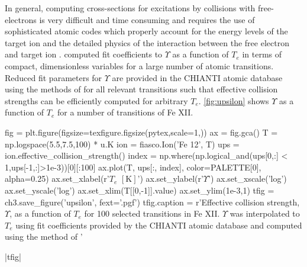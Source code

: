 In general, computing cross-sections for excitations by collisions with free-electrons is very difficult and time consuming and requires the use of sophisticated atomic codes which properly account for the energy levels of the target ion and the detailed physics of the interaction between the free electron and target ion \citep[][section 4.2.3]{phillips_ultraviolet_2008,bautista_theoretical_2000}. \citet{burgess_analysis_1992} computed fit coefficients to $\Upsilon$ as a function of $T_e$ in terms of compact, dimensionless variables for a large number of atomic transitions. Reduced fit parameters for $\Upsilon$ are provided in the CHIANTI atomic database using the methods of \citet{burgess_analysis_1992} for all relevant transitions such that effective collision strengths can be efficiently computed for arbitrary $T_e$. \autoref{fig:upsilon} shows $\Upsilon$ as a function of $T_e$ for a number of transitions of Fe XII.

\begin{pycode}[chapter3]
fig = plt.figure(figsize=texfigure.figsize(pytex,scale=1,))
ax = fig.gca()
T = np.logspace(5.5,7.5,100) * u.K
ion = fiasco.Ion('Fe 12', T)
ups = ion.effective_collision_strength()
index = np.where(np.logical_and(ups[0,:] < 1,ups[-1,:]>1e-3))[0][:100]
ax.plot(T, ups[:, index], color=PALETTE[0], alpha=0.25)
ax.set_xlabel(r'$T_e$ $[\si{\kelvin}]$')
ax.set_ylabel(r'$\Upsilon$')
ax.set_xscale('log')
ax.set_yscale('log')
ax.set_xlim(T[[0,-1]].value)
ax.set_ylim(1e-3,1)
tfig = ch3.save_figure('upsilon', fext='.pgf')
tfig.caption = r'Effective collision strength, $\Upsilon$, as a function of $T_e$ for 100 selected transitions in Fe XII. $\Upsilon$ was interpolated to $T_e$ using fit coefficients provided by the CHIANTI atomic database and computed using the method of \citet{burgess_analysis_1992}'
\end{pycode}
\py[chapter3]|tfig|

